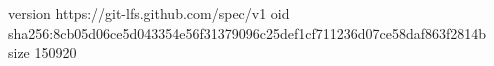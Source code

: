version https://git-lfs.github.com/spec/v1
oid sha256:8cb05d06ce5d043354e56f31379096c25def1cf711236d07ce58daf863f2814b
size 150920
